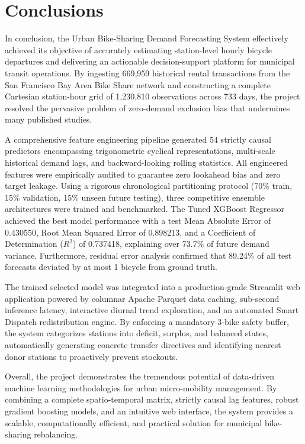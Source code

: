 \documentclass[12pt, a4paper]{article}
\renewcommand{\_}{\textunderscore\allowbreak}
\begin{document}
\section{Conclusions}

In conclusion, the Urban Bike-Sharing Demand Forecasting System effectively achieved its objective of accurately estimating station-level hourly bicycle departures and delivering an actionable decision-support platform for municipal transit operations. By ingesting 669,959 historical rental transactions from the San Francisco Bay Area Bike Share network and constructing a complete Cartesian station-hour grid of 1,230,810 observations across 733 days, the project resolved the pervasive problem of zero-demand exclusion bias that undermines many published studies.

A comprehensive feature engineering pipeline generated 54 strictly causal predictors encompassing trigonometric cyclical representations, multi-scale historical demand lags, and backward-looking rolling statistics. All engineered features were empirically audited to guarantee zero lookahead bias and zero target leakage. Using a rigorous chronological partitioning protocol (70\% train, 15\% validation, 15\% unseen future testing), three competitive ensemble architectures were trained and benchmarked. The Tuned XGBoost Regressor achieved the best model performance with a test Mean Absolute Error of 0.430550, Root Mean Squared Error of 0.898213, and a Coefficient of Determination ($R^2$) of 0.737418, explaining over 73.7\% of future demand variance. Furthermore, residual error analysis confirmed that 89.24\% of all test forecasts deviated by at most 1 bicycle from ground truth.

The trained selected model was integrated into a production-grade Streamlit web application powered by columnar Apache Parquet data caching, sub-second inference latency, interactive diurnal trend exploration, and an automated Smart Dispatch redistribution engine. By enforcing a mandatory 3-bike safety buffer, the system categorizes stations into deficit, surplus, and balanced states, automatically generating concrete transfer directives and identifying nearest donor stations to proactively prevent stockouts.

Overall, the project demonstrates the tremendous potential of data-driven machine learning methodologies for urban micro-mobility management. By combining a complete spatio-temporal matrix, strictly causal lag features, robust gradient boosting models, and an intuitive web interface, the system provides a scalable, computationally efficient, and practical solution for municipal bike-sharing rebalancing.
\end{document}
